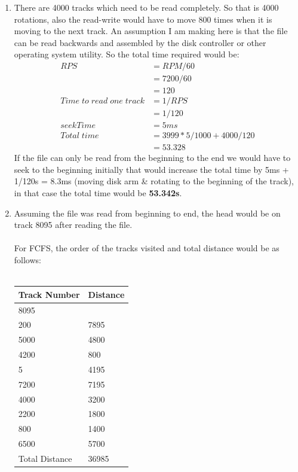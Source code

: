 \documentclass[12pt]{article}
\begin{document}
\begin{enumerate}
\begin{enumerate}
\item There are 4000 tracks which need to be read completely. So that is 4000 rotations, also the read-write would have to move 800 times when it is moving to the next track. An assumption I am making here is that the file can be read backwards and assembled by the disk controller or other operating system utility. So the total time required would be:\\
\begin{align*}
RPS &= RPM/60\\
&=7200/60\\
&=120\\
Time\;to\;read\;one\;track &= 1/RPS\\
&=1/120\\
seekTime &= 5ms\\
Total\;time &= 3999*5/1000 + 4000/120\\
&=53.328
\end{align*}
If the file can only be read from the beginning to the end we would have to seek to the beginning initially that would increase the total time by 5ms + 1/120s = 8.3ms (moving disk arm \& rotating to the beginning of the track), in that case the total time would be \textbf{53.342s}.\\
\item Assuming the file was read from beginning to end, the head would be on track 8095 after reading the file.\\\\
For FCFS, the order of the tracks visited and total distance would be as follows:\\\\
\begin{tabular}{ | l | l | }
\hline
	Track Number & Distance \\ \hline
	8095 &  \\ \hline
	200 & 7895 \\ \hline
	5000 & 4800 \\ \hline
	4200 & 800 \\ \hline
	5 & 4195 \\ \hline
	7200 & 7195 \\ \hline
	4000 & 3200 \\ \hline
	2200 & 1800 \\ \hline
	800 & 1400 \\ \hline
	6500 & 5700 \\ \hline
	Total Distance & 36985 \\ \hline
\end{tabular}\\\\\\

\end{enumerate}
\end{enumerate}
\end{document}
